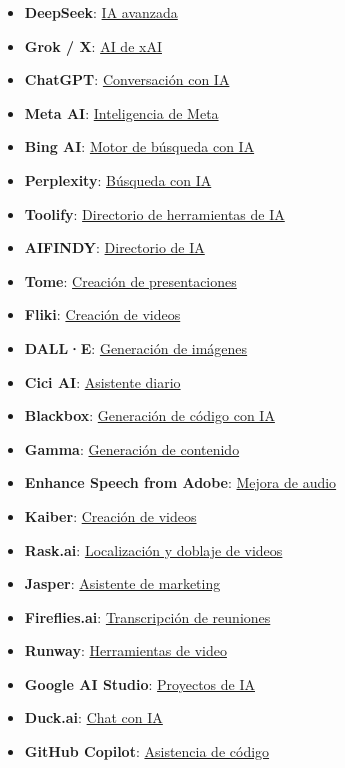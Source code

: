 \documentclass[
  jou,
  floatsintext,
  longtable,
  a4paper,
  nolmodern,
  notxfonts,
  notimes,
  colorlinks=true,linkcolor=blue,citecolor=blue,urlcolor=blue]{apa7}
\providecommand{\tightlist}{%
  \setlength{\itemsep}{0pt}\setlength{\parskip}{0pt}}
\begin{document}
\begin{itemize}
\tightlist
\item
  \textbf{DeepSeek}: \href{https://www.deepseek.com/}{IA avanzada}
\item
  \textbf{Grok / X}: \href{https://x.com/i/grok}{AI de xAI}
\item
  \textbf{ChatGPT}: \href{https://chat.openai.com/chat}{Conversación con
  IA}
\item
  \textbf{Meta AI}: \href{https://www.meta.ai/}{Inteligencia de Meta}
\item
  \textbf{Bing AI}:
  \href{https://www.bing.com/search?q=Bing+AI&showconv=1}{Motor de
  búsqueda con IA}
\item
  \textbf{Perplexity}: \href{https://www.perplexity.ai/}{Búsqueda con
  IA}
\item
  \textbf{Toolify}: \href{https://www.toolify.ai/es/}{Directorio de
  herramientas de IA}
\item
  \textbf{AIFINDY}: \href{https://aifindy.com/}{Directorio de IA}
\item
  \textbf{Tome}: \href{https://tome.app/achalmaedison}{Creación de
  presentaciones}
\item
  \textbf{Fliki}: \href{https://app.fliki.ai/studio/drive}{Creación de
  videos}
\item
  \textbf{DALL·E}: \href{https://labs.openai.com/}{Generación de
  imágenes}
\item
  \textbf{Cici AI}: \href{https://www.ciciai.com/chat/}{Asistente
  diario}
\item
  \textbf{Blackbox}: \href{https://www.blackbox.ai/}{Generación de
  código con IA}
\item
  \textbf{Gamma}: \href{https://gamma.app/generate}{Generación de
  contenido}
\item
  \textbf{Enhance Speech from Adobe}:
  \href{https://podcast.adobe.com/enhance}{Mejora de audio}
\item
  \textbf{Kaiber}:
  \href{https://kaiber.ai/?referrer_id=9a750dd5-0328-4011-9480-6c76a4d3f484}{Creación
  de videos}
\item
  \textbf{Rask.ai}: \href{https://www.rask.ai/?via=domingo}{Localización
  y doblaje de videos}
\item
  \textbf{Jasper}: \href{https://www.jasper.ai/}{Asistente de marketing}
\item
  \textbf{Fireflies.ai}: \href{https://app.fireflies.ai/}{Transcripción
  de reuniones}
\item
  \textbf{Runway}:
  \href{https://app.runwayml.com/video-tools/teams/achalmed18/dashboard}{Herramientas
  de video}
\item
  \textbf{Google AI Studio}:
  \href{https://aistudio.google.com/live}{Proyectos de IA}
\item
  \textbf{Duck.ai}:
  \href{https://duckduckgo.com/?q=DuckDuckGo+AI+Chat&ia=chat&duckai=1&atb=v463-1}{Chat
  con IA}
\item
  \textbf{GitHub Copilot}: \href{https://github.com/copilot?}{Asistencia
  de código}
\end{itemize}
\end{document}
